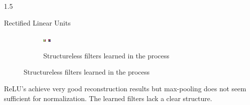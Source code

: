\documentclass[final]{beamer}
\newlength{\onecolwid}
\begin{document}
\begin{frame}[t]
\begin{columns}[t]
\begin{column}{1.5\onecolwid}
\begin{alertblock}{Rectified Linear Units}
\begin{figure}
\begin{subfigure}{0.4\linewidth}
					\includegraphics[width=0.1\linewidth]{graphics/reconstructions/cifar/relu/relu_filter_07.png} \hspace{0.05\linewidth}
					\includegraphics[width=0.1\linewidth]{graphics/reconstructions/cifar/relu/relu_filter_08.png} 

					\caption{Structureless filters learned in the process}

				\end{subfigure}


			\end{figure}

			ReLU's achieve very good reconstruction results but max-pooling does not seem sufficient for normalization. The learned filters lack a clear structure.

		\end{alertblock}

		\end{column}



\end{columns}



\end{frame} %
\end{document}
